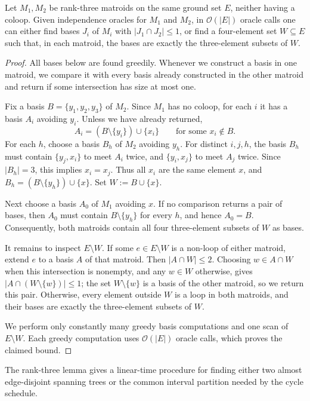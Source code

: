 \documentclass[USenglish, a4paper, thm-restate,numberwithinsect, cleveref]{lipics-v2021}
\newcommand{\Oh}{\mathcal{O}}
\begin{document}
\begin{lemma}\label{lem:rank-three}
Let $M_1,M_2$ be rank-three matroids on the same ground set $E$, neither
having a coloop. Given independence oracles for $M_1$ and $M_2$, in
$\Oh(|E|)$ oracle calls one can either find bases $J_i$ of $M_i$ with
$|J_1\cap J_2|\leq1$, or find a four-element set $W\subseteq E$ such
that, in each matroid, the bases are exactly the three-element subsets
of $W$.
\end{lemma}
\begin{proof}
All bases below are found greedily. Whenever we construct a basis in
one matroid, we compare it with every basis already constructed in the
other matroid and return if some intersection has size at most one.

Fix a basis $B=\{y_1,y_2,y_3\}$ of $M_2$. Since $M_1$ has no coloop,
for each $i$ it has a basis $A_i$ avoiding $y_i$. Unless we have already
returned,
\[
  A_i=(B\setminus\{y_i\})\cup\{x_i\}
  \qquad\text{for some }x_i\notin B.
\]
For each $h$, choose a basis $B_h$ of $M_2$ avoiding $y_h$. For distinct
$i,j,h$, the basis $B_h$ must contain $\{y_j,x_i\}$ to meet $A_i$ twice,
and $\{y_i,x_j\}$ to meet $A_j$ twice. Since $|B_h|=3$, this implies
$x_i=x_j$. Thus all $x_i$ are the same element $x$, and
$B_h=(B\setminus\{y_h\})\cup\{x\}$. Set $W:=B\cup\{x\}$.

Next choose a basis $A_0$ of $M_1$ avoiding $x$. If no comparison
returns a pair of bases, then $A_0$ must contain $B\setminus\{y_h\}$
for every $h$, and hence $A_0=B$. Consequently, both matroids contain
all four three-element subsets of $W$ as bases.

It remains to inspect $E\setminus W$. If some $e\in E\setminus W$ is
a non-loop of either matroid, extend $e$ to a basis $A$ of that matroid.
Then $|A\cap W|\leq2$. Choosing $w\in A\cap W$ when this intersection
is nonempty, and any $w\in W$ otherwise, gives
$|A\cap(W\setminus\{w\})|\leq1$; the set $W\setminus\{w\}$ is a basis
of the other matroid, so we return this pair. Otherwise, every element
outside $W$ is a loop in both matroids, and their bases are exactly the
three-element subsets of $W$.

We perform only constantly many greedy basis computations and one scan
of $E\setminus W$. Each greedy computation uses $\Oh(|E|)$ oracle calls,
which proves the claimed bound.
\end{proof}

The rank-three lemma gives a linear-time procedure for finding either
two almost edge-disjoint spanning trees or the common interval
partition needed by the cycle schedule.
\end{document}
